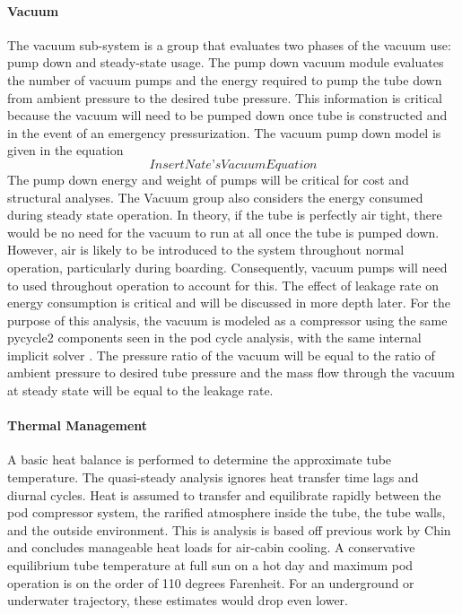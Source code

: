 \paragraph{Vacuum}
	The vacuum sub-system is a group that evaluates two phases of the vacuum
	use: pump down and steady-state usage. The pump down vacuum module
	evaluates the number of vacuum pumps and the energy required to pump the
	tube down from ambient pressure to the desired tube pressure.
	This information is critical because the vacuum will need to be pumped down
	once tube is constructed and in the event of an emergency pressurization.
	The vacuum pump down model is given in the equation
	\begin{equation}
		\label{eq:vacuum}
		Insert Nate’s Vacuum Equation
	\end{equation}
	The pump down energy and weight of pumps will be critical for cost and structural analyses.
	The Vacuum group also considers the energy consumed during steady state operation.
	In theory, if the tube is perfectly air tight, there would be no need for
	the vacuum to run at all once the tube is pumped down. However, air is likely to be introduced
	to the system throughout normal operation, particularly during boarding. Consequently, 
	vacuum pumps will need to used throughout operation to account for this.
	The effect of leakage rate on energy consumption is critical and will be
	discussed in more depth later. For the purpose of this analysis, the vacuum
	is modeled as a compressor using the same pycycle2 components seen in the
	pod cycle analysis, with the same internal implicit solver \cite{pycycle2}.
	The pressure ratio of the vacuum will be equal to the ratio of ambient
	pressure to desired tube pressure and the mass flow through the vacuum at
	steady state will be equal to the leakage rate.
\paragraph{Thermal Management}
	A basic heat balance is performed to determine the approximate tube temperature.
	The quasi-steady analysis ignores heat transfer time lags and diurnal cycles.
	Heat is assumed to transfer and equilibrate rapidly between the pod compressor system,
	the rarified atmosphere inside the tube, the tube walls, and the outside environment.
	This is analysis is based off previous work by Chin\cite{Chin} and concludes
	manageable heat loads for air-cabin cooling. A conservative equilibrium
	tube temperature at full sun on a hot day and maximum pod operation is on
	the order of 110 degrees Farenheit.
	For an underground or underwater trajectory, these estimates would drop even lower.
